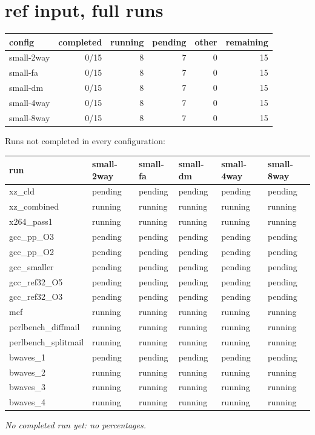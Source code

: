 \documentclass[10pt,a4paper,landscape]{article}
\begin{document}
\section*{ref input, full runs}
{\small
\begin{longtable}{lrrrrr}
\toprule
config & completed & running & pending & other & remaining \\
\midrule
\endhead
\bottomrule
\endfoot
small-2way & 0/15 & 8 & 7 & 0 & 15 \\
small-fa & 0/15 & 8 & 7 & 0 & 15 \\
small-dm & 0/15 & 8 & 7 & 0 & 15 \\
small-4way & 0/15 & 8 & 7 & 0 & 15 \\
small-8way & 0/15 & 8 & 7 & 0 & 15 \\
\end{longtable}
}
{\small Runs not completed in every configuration:}\par
\begin{longtable}{llllll}
\toprule
run & small-2way & small-fa & small-dm & small-4way & small-8way \\
\midrule
\endhead
\bottomrule
\endfoot
xz\_cld & pending & pending & pending & pending & pending \\
xz\_combined & running & running & running & running & running \\
x264\_pass1 & running & running & running & running & running \\
gcc\_pp\_O3 & pending & pending & pending & pending & pending \\
gcc\_pp\_O2 & pending & pending & pending & pending & pending \\
gcc\_smaller & pending & pending & pending & pending & pending \\
gcc\_ref32\_O5 & pending & pending & pending & pending & pending \\
gcc\_ref32\_O3 & pending & pending & pending & pending & pending \\
mcf & running & running & running & running & running \\
perlbench\_diffmail & running & running & running & running & running \\
perlbench\_splitmail & running & running & running & running & running \\
bwaves\_1 & pending & pending & pending & pending & pending \\
bwaves\_2 & running & running & running & running & running \\
bwaves\_3 & running & running & running & running & running \\
bwaves\_4 & running & running & running & running & running \\
\end{longtable}
\emph{No completed run yet: no percentages.}\par
\clearpage
\end{document}
